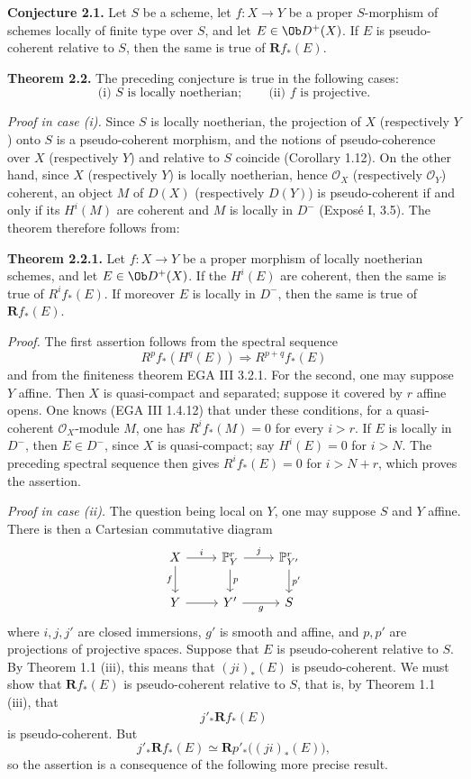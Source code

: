 \documentclass[11pt]{article}
\begin{document}
\textbf{Conjecture 2.1.} Let \(S\) be a scheme, let \(f:X\to Y\) be a proper \(S\)-morphism of schemes locally of finite type over \(S\), and let \(E\in \Ob D^+(X)\). If \(E\) is pseudo-coherent relative to \(S\), then the same is true of \(\mathbf R f_*(E)\).

\textbf{Theorem 2.2.} The preceding conjecture is true in the following cases:
\[
  \text{(i) } S\text{ is locally noetherian};\qquad
  \text{(ii) } f\text{ is projective}.
\]

\emph{Proof in case (i).} Since \(S\) is locally noetherian, the projection of \(X\) (respectively \(Y\)) onto \(S\) is a pseudo-coherent morphism, and the notions of pseudo-coherence over \(X\) (respectively \(Y\)) and relative to \(S\) coincide (Corollary 1.12). On the other hand, since \(X\) (respectively \(Y\)) is locally noetherian, hence \(\mathcal O_X\) (respectively \(\mathcal O_Y\)) coherent, an object \(M\) of \(D(X)\) (respectively \(D(Y)\)) is pseudo-coherent if and only if its \(H^i(M)\) are coherent and \(M\) is locally in \(D^{-}\) (Exposé I, 3.5). The theorem therefore follows from:

\textbf{Theorem 2.2.1.} Let \(f:X\to Y\) be a proper morphism of locally noetherian schemes, and let \(E\in \Ob D^+(X)\). If the \(H^i(E)\) are coherent, then the same is true of \(R^if_*(E)\). If moreover \(E\) is locally in \(D^{-}\), then the same is true of \(\mathbf Rf_*(E)\).

\emph{Proof.} The first assertion follows from the spectral sequence
\[
  R^pf_*(H^q(E)) \Longrightarrow R^{p+q}f_*(E)
\]
and from the finiteness theorem EGA III 3.2.1. For the second, one may suppose \(Y\) affine. Then \(X\) is quasi-compact and separated; suppose it covered by \(r\) affine opens. One knows (EGA III 1.4.12) that under these conditions, for a quasi-coherent \(\mathcal O_X\)-module \(M\), one has \(R^if_*(M)=0\) for every \(i>r\). If \(E\) is locally in \(D^{-}\), then \(E\in D^{-}\), since \(X\) is quasi-compact; say \(H^i(E)=0\) for \(i>N\). The preceding spectral sequence then gives \(R^if_*(E)=0\) for \(i>N+r\), which proves the assertion.

\emph{Proof in case (ii).} The question being local on \(Y\), one may suppose \(S\) and \(Y\) affine. There is then a Cartesian commutative diagram
\[
\begin{tikzcd}
X \arrow[r,"i"] \arrow[d,"f"'] & \mathbb P^r_Y \arrow[d,"p"] \arrow[r,"j"] & \mathbb P^r_{Y'} \arrow[d,"p'"]\\
Y \arrow[r] & Y' \arrow[r,"g"'] & S
\end{tikzcd}
\]
where \(i,j,j'\) are closed immersions, \(g'\) is smooth and affine, and \(p,p'\) are projections of projective spaces. Suppose that \(E\) is pseudo-coherent relative to \(S\). By Theorem 1.1 (iii), this means that \((ji)_*(E)\) is pseudo-coherent. We must show that \(\mathbf Rf_*(E)\) is pseudo-coherent relative to \(S\), that is, by Theorem 1.1 (iii), that
\[
  j'_*\mathbf Rf_*(E)
\]
is pseudo-coherent. But
\[
  j'_*\mathbf Rf_*(E)\simeq \mathbf Rp'_*\bigl((ji)_*(E)\bigr),
\]
so the assertion is a consequence of the following more precise result.
\end{document}
